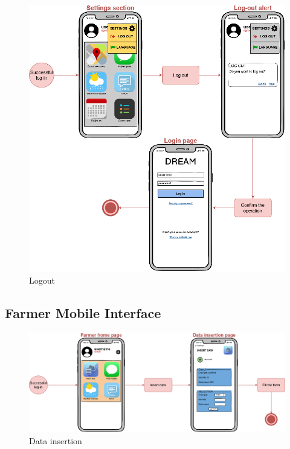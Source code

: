 \begin{center}
    \begin{figure}[H]
        \includegraphics[width=\textwidth]{Images/UserInterface/Diagram/logout.drawio.png}
        \caption{Logout}
    \end{figure}
\end{center}
\newpage

\subsection{Farmer Mobile Interface}
\begin{center}
    \begin{figure}[H]
        \includegraphics[width=\textwidth]{Images/UserInterface/Diagram/farmerData.drawio.png}
        \caption{Data insertion}
    \end{figure}
\end{center}

